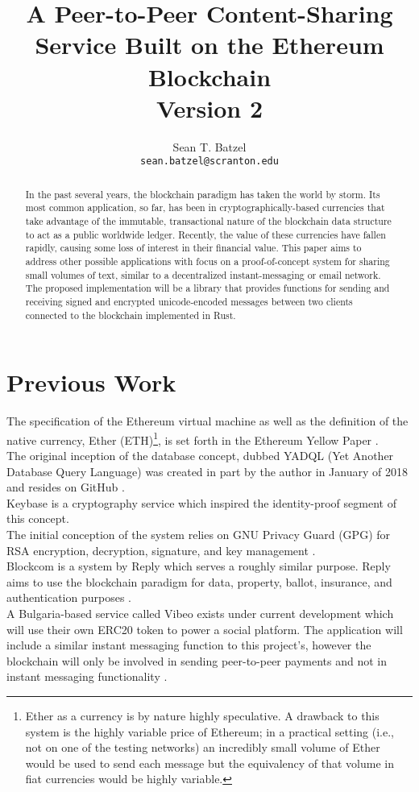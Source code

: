 \documentclass[]{article}
\title{A Peer-to-Peer Content-Sharing Service Built on the Ethereum Blockchain\\\large Version 2}
\author{Sean T. Batzel\\\texttt{sean.batzel@scranton.edu}}
\begin{document}
\maketitle
\tableofcontents

\pagebreak

\begin{abstract}
  In the past several years, the \gls{blockchain} paradigm has taken the world by storm. Its most common application, so far, has been in cryptographically-based currencies that take advantage of the immutable, transactional nature of the blockchain data structure to act as a public worldwide ledger. Recently, the value of these currencies have fallen rapidly, causing some loss of interest in their financial value. This paper aims to address other possible applications with focus on a proof-of-concept system for sharing small volumes of text, similar to a decentralized instant-messaging or email network. The proposed implementation will be a library that provides functions for sending and receiving signed and encrypted unicode-encoded messages between two clients connected to the blockchain implemented in Rust.
\end{abstract}

\section{Previous Work}
The specification of the Ethereum virtual machine as well as the definition of the native currency, Ether (ETH)\footnote{Ether as a currency is by nature highly speculative. A drawback to this system is the highly variable price of Ethereum; in a practical setting (i.e., not on one of the testing networks) an incredibly small volume of Ether would be used to send each message but the equivalency of that volume in fiat currencies would be highly variable.}, is set forth in the Ethereum Yellow Paper \cite{yellowpaper}.\\
The original inception of the database concept, dubbed YADQL (Yet Another Database Query Language) was created in part by the author in January of 2018 and resides on GitHub \cite{yadql}.\\
Keybase is a cryptography service which inspired the identity-proof segment of this concept. \cite{keybase}\\
The initial conception of the system relies on GNU Privacy Guard (GPG) for RSA encryption, decryption, signature, and key management \cite{gpg}.\\
Blockcom is a system by Reply which serves a roughly similar purpose. Reply aims to use the blockchain paradigm for data, property, ballot, insurance, and authentication purposes \cite{reply}.\\
A Bulgaria-based service called Vibeo exists under current development which will use their own ERC20 token to power a social platform. The application will include a similar instant messaging function to this project's, however the blockchain will only be involved in sending peer-to-peer payments and not in instant messaging functionality \cite{vibeo}.
\end{document}
